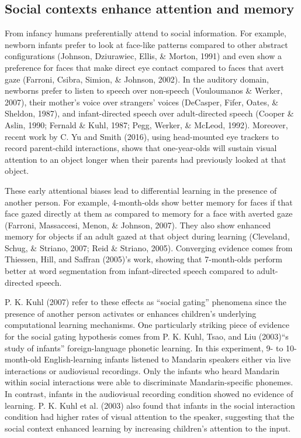 \documentclass[english,floatsintext,man]{apa6}
\theoremstyle{definition}
\theoremstyle{definition}
\theoremstyle{definition}
\theoremstyle{remark}
\begin{document}
\subsection{Social contexts enhance attention and
memory}\label{social-contexts-enhance-attention-and-memory}

From infancy humans preferentially attend to social information. For
example, newborn infants prefer to look at face-like patterns compared
to other abstract configurations (Johnson, Dziurawiec, Ellis, \& Morton,
1991) and even show a preference for faces that make direct eye contact
compared to faces that avert gaze (Farroni, Csibra, Simion, \& Johnson,
2002). In the auditory domain, newborns prefer to listen to speech over
non-speech (Vouloumanos \& Werker, 2007), their mother's voice over
strangers' voices (DeCasper, Fifer, Oates, \& Sheldon, 1987), and
infant-directed speech over adult-directed speech (Cooper \& Aslin,
1990; Fernald \& Kuhl, 1987; Pegg, Werker, \& McLeod, 1992). Moreover,
recent work by C. Yu and Smith (2016), using head-mounted eye trackers
to record parent-child interactions, shows that one-year-olds will
sustain visual attention to an object longer when their parents had
previously looked at that object.

These early attentional biases lead to differential learning in the
presence of another person. For example, 4-month-olds show better memory
for faces if that face gazed directly at them as compared to memory for
a face with averted gaze (Farroni, Massaccesi, Menon, \& Johnson, 2007).
They also show enhanced memory for objects if an adult gazed at that
object during learning (Cleveland, Schug, \& Striano, 2007; Reid \&
Striano, 2005). Converging evidence comes from Thiessen, Hill, and
Saffran (2005)'s work, showing that 7-month-olds perform better at word
segmentation from infant-directed speech compared to adult-directed
speech.

P. K. Kuhl (2007) refer to these effects as \enquote{social gating}
phenomena since the presence of another person activates or enhances
children's underlying computational learning mechanisms. One
particularly striking piece of evidence for the social gating hypothesis
comes from P. K. Kuhl, Tsao, and Liu (2003)\enquote{s study of infants}
foreign-language phonetic learning. In this experiment, 9- to
10-month-old English-learning infants listened to Mandarin speakers
either via live interactions or audiovisual recordings. Only the infants
who heard Mandarin within social interactions were able to discriminate
Mandarin-specific phonemes. In contrast, infants in the audiovisual
recording condition showed no evidence of learning. P. K. Kuhl et al.
(2003) also found that infants in the social interaction condition had
higher rates of visual attention to the speaker, suggesting that the
social context enhanced learning by increasing children's attention to
the input.
\end{document}
